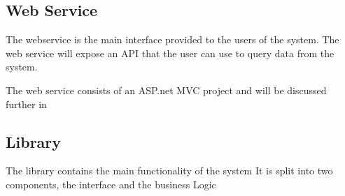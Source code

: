 \subsection{Web Service}
The webservice is the main interface provided to the users of the system.
The web service will expose an API that the user can use to query data from the system.

The web service consists of an ASP.net MVC project and will be discussed further in 

\subsection{Library}
The library contains the main functionality of the system 
It is split into two components, the interface and the business Logic